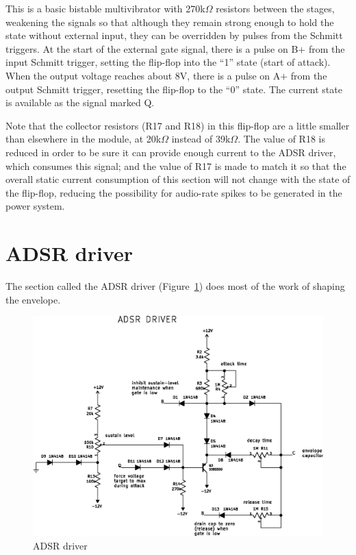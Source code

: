 This is a basic bistable multivibrator with 270k$\Omega$ resistors between
the stages, weakening the signals so that although they remain strong
enough to hold the state without external input, they can be overridden by
pulses from the Schmitt triggers.  At the start of the external gate signal,
there is a pulse on B$+$ from the input Schmitt trigger, setting the flip-flop
into the ``1'' state (start of attack).  When the output voltage reaches about 8V, there is a
pulse on A$+$ from the output Schmitt trigger, resetting the flip-flop to
the ``0'' state.  The current state is available as the signal marked Q.

Note that the collector resistors (R17 and R18) in this flip-flop are a
little smaller than elsewhere in the module, at 20k$\Omega$ instead of
39k$\Omega$.  The value of R18 is reduced in order to be sure it can provide
enough current to the ADSR driver, which consumes this signal; and the value
of R17 is made to match it so that the overall static current consumption of
this section will not change with the state of the flip-flop, reducing the
possibility for audio-rate spikes to be generated in the power system.

\section{ADSR driver}

The section called the ADSR driver (Figure~\ref{fig:adsr-driver}) does most
of the work of shaping the envelope.

\begin{figure}
  \centering\includegraphics{adsr-driver}\par
  \caption{ADSR driver}
  \label{fig:adsr-driver}
\end{figure}


